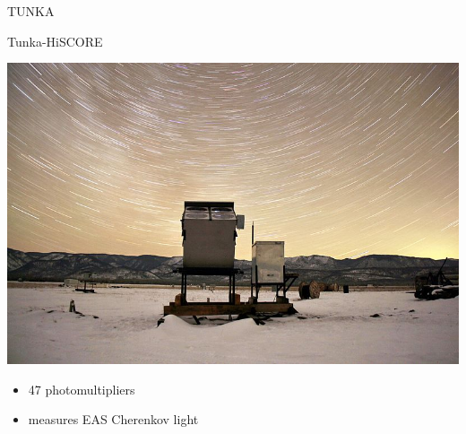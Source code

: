 \begin{frame}{TUNKA}
\begin{minipage}[t]{0.48\textwidth}
\begin{block}{Tunka-HiSCORE}
    \parbox{0.43\textwidth}{
    \centering
    \includegraphics[height=0.23\textheight]{pics/Tunka-HiSCORE.jpg}
    }
    \parbox{0.55\textwidth}{
    \begin{itemize}
      \setlength{\itemsep}{0pt}
      \item 47 photomultipliers
      \item measures EAS Cherenkov light
    \end{itemize}
    }
  \end{block}
\end{minipage}


\end{frame}

%
%
